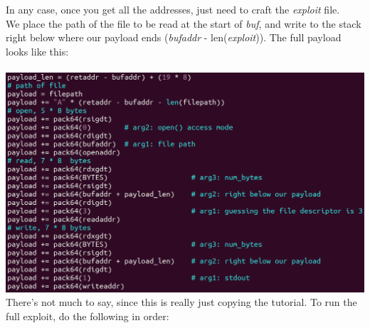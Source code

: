 \documentclass[12pt]{article}
\begin{document}
\newpage

In any case, once you get all the addresses, just need to craft the \emph{exploit} file.\\

We place the path of the file to be read at the start of \emph{buf}, and write to the stack right below where our payload ends (\emph{bufaddr} - len(\emph{exploit})).
The full payload looks like this:\\\\

\includegraphics[scale=0.6]{./a2/rop/exploit.PNG}\\

There's not much to say, since this is really just copying the tutorial.
To run the full exploit, do the following in order:
\end{document}
